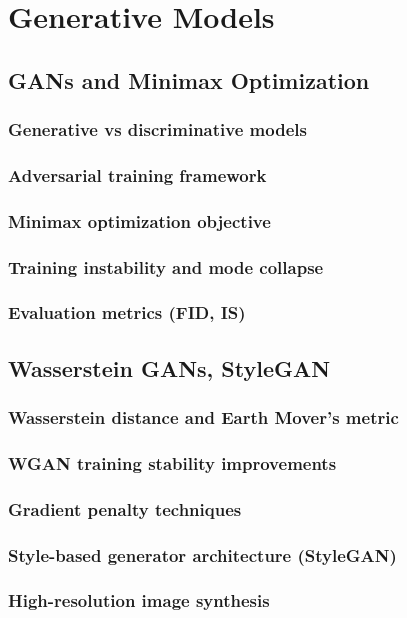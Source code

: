 ﻿\chapter{Generative Models}
\section{GANs and Minimax Optimization}
\subsection{Generative vs discriminative models}
\subsection{Adversarial training framework}
\subsection{Minimax optimization objective}
\subsection{Training instability and mode collapse}
\subsection{Evaluation metrics (FID, IS)}

\section{Wasserstein GANs, StyleGAN}
\subsection{Wasserstein distance and Earth Mover's metric}
\subsection{WGAN training stability improvements}
\subsection{Gradient penalty techniques}
\subsection{Style-based generator architecture (StyleGAN)}
\subsection{High-resolution image synthesis}

